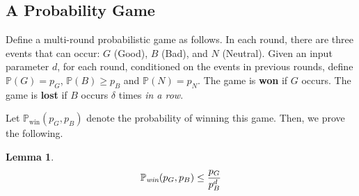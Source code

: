 \documentclass[11pt]{amsart}
\newtheorem{lemma}[theorem]{Lemma}
\renewcommand{\Pr}{\mathbb{P}}
\newcommand{\defn}{\textbf}
\begin{document}
\subsection{A Probability Game}
\label{sec:game}

Define a multi-round probabilistic game as follows. In each round, there are three events that can occur: $G$ (Good), $B$ (Bad), and $N$ (Neutral).  Given an input parameter $d$,  for each round, conditioned on the events in previous rounds, define
$\Pr(G) = p_G$, $\Pr(B) \geq p_B$ and $\Pr(N) = p_N$.  The game is \defn{won} if $G$ occurs.  The game is \defn{lost} if $B$ occurs $\delta$ times \emph{in a row}.  

Let $\Pr_{\text{win}}(p_G, p_B)$ denote the probability of winning this game.  Then, we prove the following.

\begin{lemma}\label{lem:probgame}
\begin{equation*}
  \Pr_{\text{\em win}}(p_G, p_B) 
\leq \frac{p_G}{p_B^d}
\end{equation*}
\end{lemma}
\end{document}
